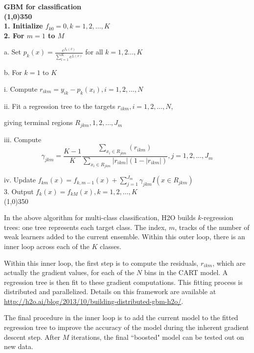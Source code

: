 \bf{\footnotesize{GBM for classification}}
\normalfont
\\
\line(1,0){350}
\\
1. Initialize $f_{k0} = 0, k = 1,2,\dots,K$
\\
2. For $m=1$ to $M$

\hspace{1cm} a. Set $p_k(x) = \frac{e^{f_k(x)}}{\sum_{l=1}^K e^{f_l(x)}}$ for all $k = 1,2\dots, K$

\hspace{1cm} b. For $k=1$ to $K$

\hspace{2cm} i. Compute $r_{ikm} = y_{ik} - p_k(x_i),  i = 1,2,\dots,N$

\hspace{2cm} ii. Fit a regression tree to the targets $r_{ikm}, i = 1,2,\dots,N$,
\par \hspace{2.5cm} giving terminal regions $R_{jkm}, 1,2,\dots,J_m$

\hspace{2cm}iii. Compute $$\gamma_{jkm} = \frac{K-1}{K} \frac{\sum_{x_i \in R_{jkm}} (r_{ikm})}{\sum_{x_i \in R_{jkm}} |r_{ikm}| (1 - |r_{ikm}|)} , j=1,2,\dots,J_m$$

\hspace{2cm} iv. Update $f_{km}(x) = f_{k,m-1}(x) + \sum_{j=1}^{J_m} \gamma_{jkm} I(x \in R_{jkm})$
\\
3. Output $f_k^{\hat{}}(x) = f_{kM}(x),  k=1,2,\dots,K$
\\
\line(1,0){350}

In the above algorithm for multi-class classification, H2O builds $k$-regression trees: one tree represents each target class. The index, $m$, tracks of the number of weak learners added to the current ensemble. Within this outer loop, there is an inner loop across each of the $K$ classes. 

\begin{minipage}{\textwidth}
Within this inner loop, the first step is to compute the residuals, $r_{ikm}$, which are actually the gradient values, for each of the $N$ bins in the CART model. A regression tree is then fit to these gradient computations. This fitting process is distributed and parallelized. Details on this framework are available at {\url{http://h2o.ai/blog/2013/10/building-distributed-gbm-h2o/}}.
\end{minipage}

The final procedure in the inner loop is to add the current model to the fitted regression tree to improve the accuracy of the model during the inherent gradient descent step. After $M$ iterations, the final ``boosted" model can be tested out on new data.

